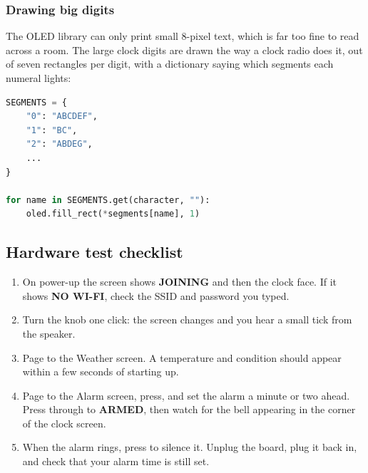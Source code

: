 \subsubsection{Drawing big digits}
The OLED library can only print small 8-pixel text, which is far too fine to read across a room. The
large clock digits are drawn the way a clock radio does it, out of seven rectangles per digit, with a
dictionary saying which segments each numeral lights:

\begin{lstlisting}[language=Python, caption=Seven-segment digits]
SEGMENTS = {
    "0": "ABCDEF",
    "1": "BC",
    "2": "ABDEG",
    ...
}

for name in SEGMENTS.get(character, ""):
    oled.fill_rect(*segments[name], 1)
\end{lstlisting}

\subsection{Hardware test checklist}
\begin{enumerate}
    \item On power-up the screen shows \textbf{JOINING} and then the clock face. If it shows
          \textbf{NO WI-FI}, check the SSID and password you typed.
    \item Turn the knob one click: the screen changes and you hear a small tick from the speaker.
    \item Page to the Weather screen. A temperature and condition should appear within a few
          seconds of starting up.
    \item Page to the Alarm screen, press, and set the alarm a minute or two ahead. Press through to
          \textbf{ARMED}, then watch for the bell appearing in the corner of the clock screen.
    \item When the alarm rings, press to silence it. Unplug the board, plug it back in, and check
          that your alarm time is still set.
\end{enumerate}

